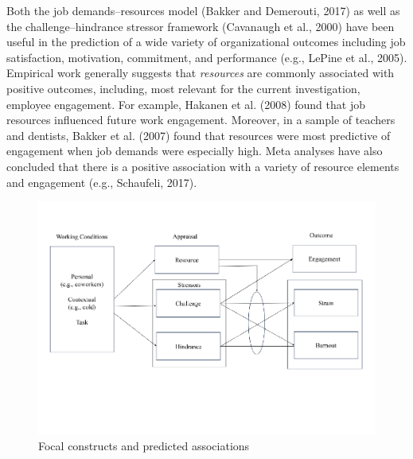 \documentclass[
  man]{apa7}
\begin{document}
Both the job demands--resources model (Bakker and Demerouti, 2017) as well as the challenge--hindrance stressor framework (Cavanaugh et al., 2000) have been useful in the prediction of a wide variety of organizational outcomes including job satisfaction, motivation, commitment, and performance (e.g., LePine et al., 2005). Empirical work generally suggests that \emph{resources} are commonly associated with positive outcomes, including, most relevant for the current investigation, employee engagement. For example, Hakanen et al. (2008) found that job resources influenced future work engagement. Moreover, in a sample of teachers and dentists, Bakker et al. (2007) found that resources were most predictive of engagement when job demands were especially high. Meta analyses have also concluded that there is a positive association with a variety of resource elements and engagement (e.g., Schaufeli, 2017).

\begin{figure}
\centering
\includegraphics{Submission_files/figure-latex/ourmodel-1.pdf}
\caption{\label{fig:ourmodel}Focal constructs and predicted associations}
\end{figure}
\end{document}
